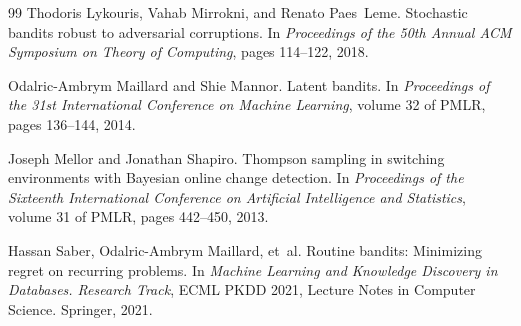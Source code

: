 \documentclass[11pt]{article}
\begin{document}
\begin{thebibliography}{99}
Thodoris Lykouris, Vahab Mirrokni, and Renato Paes~Leme.
\newblock Stochastic bandits robust to adversarial corruptions.
\newblock In \emph{Proceedings of the 50th Annual ACM Symposium on Theory of Computing}, pages 114--122, 2018.

Odalric-Ambrym Maillard and Shie Mannor.
\newblock Latent bandits.
\newblock In \emph{Proceedings of the 31st International Conference on Machine Learning}, volume 32 of PMLR, pages 136--144, 2014.

Joseph Mellor and Jonathan Shapiro.
\newblock Thompson sampling in switching environments with Bayesian online change detection.
\newblock In \emph{Proceedings of the Sixteenth International Conference on Artificial Intelligence and Statistics}, volume 31 of PMLR, pages 442--450, 2013.

Hassan Saber, Odalric-Ambrym Maillard, et~al.
\newblock Routine bandits: Minimizing regret on recurring problems.
\newblock In \emph{Machine Learning and Knowledge Discovery in Databases. Research Track}, ECML PKDD 2021, Lecture Notes in Computer Science. Springer, 2021.

\end{thebibliography}
\end{document}
